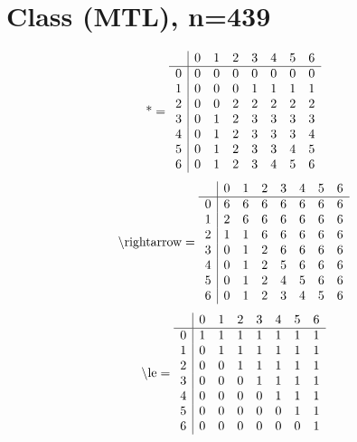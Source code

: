 \documentclass[11pt]{article}
\begin{document}
\section{Class (MTL), n=439}
\[\text{*} = 
\begin{array}{r | r r r r r r r}
 & 0 & 1 & 2 & 3 & 4 & 5 & 6 \\ \hline
0 & 0 & 0 & 0 & 0 & 0 & 0 & 0 \\
1 & 0 & 0 & 0 & 1 & 1 & 1 & 1 \\
2 & 0 & 0 & 2 & 2 & 2 & 2 & 2 \\
3 & 0 & 1 & 2 & 3 & 3 & 3 & 3 \\
4 & 0 & 1 & 2 & 3 & 3 & 3 & 4 \\
5 & 0 & 1 & 2 & 3 & 3 & 4 & 5 \\
6 & 0 & 1 & 2 & 3 & 4 & 5 & 6 \\
\end{array}
\]
\[\text{\textbackslash rightarrow} = 
\begin{array}{r | r r r r r r r}
 & 0 & 1 & 2 & 3 & 4 & 5 & 6 \\ \hline
0 & 6 & 6 & 6 & 6 & 6 & 6 & 6 \\
1 & 2 & 6 & 6 & 6 & 6 & 6 & 6 \\
2 & 1 & 1 & 6 & 6 & 6 & 6 & 6 \\
3 & 0 & 1 & 2 & 6 & 6 & 6 & 6 \\
4 & 0 & 1 & 2 & 5 & 6 & 6 & 6 \\
5 & 0 & 1 & 2 & 4 & 5 & 6 & 6 \\
6 & 0 & 1 & 2 & 3 & 4 & 5 & 6 \\
\end{array}
\]
\[\text{\textbackslash le} = 
\begin{array}{r | r r r r r r r}
 & 0 & 1 & 2 & 3 & 4 & 5 & 6 \\ \hline
0 & 1 & 1 & 1 & 1 & 1 & 1 & 1 \\
1 & 0 & 1 & 1 & 1 & 1 & 1 & 1 \\
2 & 0 & 0 & 1 & 1 & 1 & 1 & 1 \\
3 & 0 & 0 & 0 & 1 & 1 & 1 & 1 \\
4 & 0 & 0 & 0 & 0 & 1 & 1 & 1 \\
5 & 0 & 0 & 0 & 0 & 0 & 1 & 1 \\
6 & 0 & 0 & 0 & 0 & 0 & 0 & 1 \\
\end{array}
\]
\end{document}
